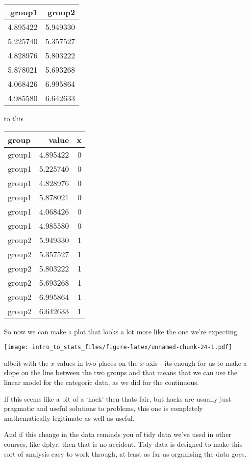 \documentclass[]{book}
\begin{document}
\begin{tabular}{r|r}
\hline
group1 & group2\\
\hline
4.895422 & 5.949330\\
\hline
5.225740 & 5.357527\\
\hline
4.828976 & 5.803222\\
\hline
5.878021 & 5.693268\\
\hline
4.068426 & 6.995864\\
\hline
4.985580 & 6.642633\\
\hline
\end{tabular}

to this

\begin{tabular}{l|r|r}
\hline
group & value & x\\
\hline
group1 & 4.895422 & 0\\
\hline
group1 & 5.225740 & 0\\
\hline
group1 & 4.828976 & 0\\
\hline
group1 & 5.878021 & 0\\
\hline
group1 & 4.068426 & 0\\
\hline
group1 & 4.985580 & 0\\
\hline
group2 & 5.949330 & 1\\
\hline
group2 & 5.357527 & 1\\
\hline
group2 & 5.803222 & 1\\
\hline
group2 & 5.693268 & 1\\
\hline
group2 & 6.995864 & 1\\
\hline
group2 & 6.642633 & 1\\
\hline
\end{tabular}

So now we can make a plot that looks a lot more like the one we're expecting

\texttt{[image: intro\_to\_stats\_files/figure-latex/unnamed-chunk-24-1.pdf]}

albeit with the \(x\)-values in two places on the \(x\)-axis - its enough for us to make a slope on the line between the two groups and that means that we can use the linear model for the categoric data, as we did for the continuous.

If this seems like a bit of a `hack' then thats fair, but hacks are usually just pragmatic and useful solutions to problems, this one is completely mathematically legitimate as well as useful.

And if this change in the data reminds you of tidy data we've used in other courses, like dplyr, then that is no accident. Tidy data is designed to make this sort of analysis easy to work through, at least as far as organising the data goes.
\end{document}
